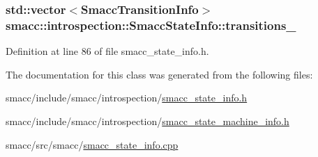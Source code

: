 \subsubsection[{\texorpdfstring{transitions\+\_\+}{transitions_}}]{\setlength{\rightskip}{0pt plus 5cm}std\+::vector$<${\bf Smacc\+Transition\+Info}$>$ smacc\+::introspection\+::\+Smacc\+State\+Info\+::transitions\+\_\+}\hypertarget{classsmacc_1_1introspection_1_1SmaccStateInfo_ae8b5d8e409e377ef9a88d92fb31a8446}{}\label{classsmacc_1_1introspection_1_1SmaccStateInfo_ae8b5d8e409e377ef9a88d92fb31a8446}


Definition at line 86 of file smacc\+\_\+state\+\_\+info.\+h.



The documentation for this class was generated from the following files\+:\begin{DoxyCompactItemize}
\item 
smacc/include/smacc/introspection/\hyperlink{smacc__state__info_8h}{smacc\+\_\+state\+\_\+info.\+h}\item 
smacc/include/smacc/introspection/\hyperlink{smacc__state__machine__info_8h}{smacc\+\_\+state\+\_\+machine\+\_\+info.\+h}\item 
smacc/src/smacc/\hyperlink{smacc__state__info_8cpp}{smacc\+\_\+state\+\_\+info.\+cpp}\end{DoxyCompactItemize}
